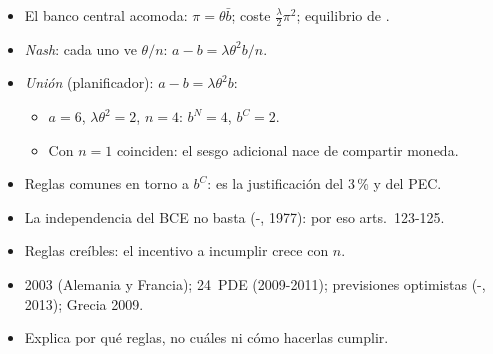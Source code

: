 \documentclass{article}
\begin{document}
\begin{columnas}
\begin{itemize}
\item El banco central acomoda: $\pi=\theta\bar b$; coste $\frac\lambda2\pi^2$; equilibrio de .
\end{itemize}
\begin{itemize}
\item \emph{Nash}: cada uno ve $\theta/n$: $a-b=\lambda\theta^2b/n$.
\item \emph{Unión} (planificador): $a-b=\lambda\theta^2b$:
  \begin{itemize}
  \item $a=6$, $\lambda\theta^2=2$, $n=4$: $b^N=4$, $b^C=2$.
  \item Con $n=1$ coinciden: el sesgo adicional nace de compartir moneda.
  \end{itemize}
\end{itemize}
\begin{itemize}
\item Reglas comunes en torno a $b^C$: es la justificación del 3\,\% y del PEC.
\item La independencia del BCE no basta (-, 1977): por eso arts.~123-125.
\item Reglas creíbles: el incentivo a incumplir crece con $n$.
\end{itemize}
\begin{itemize}
\item 2003 (Alemania y Francia); 24~PDE (2009-2011); previsiones optimistas (-, 2013); Grecia 2009.
\item Explica por qué reglas, no cuáles ni cómo hacerlas cumplir.
\end{itemize}


\end{columnas}
\end{document}

